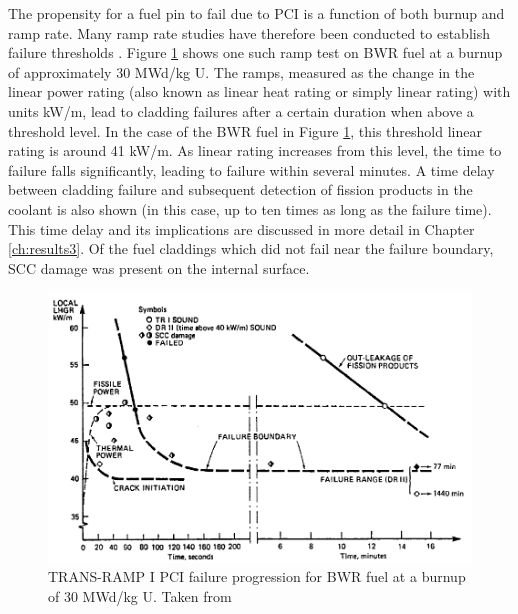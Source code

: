 The propensity for a fuel pin to fail due to PCI is a function of both burnup and ramp rate. Many ramp rate studies have therefore been conducted to establish failure thresholds \cite{Thomas1979, mogard1980studsvik, franklin1985performance, mogard1985international, djurle1984super, howe1991ramp, baba1983power, suzuki1994bumup, wesley1994mark, djurle1983studsvik, hollowell1982international}. Figure \ref{figure:BWRrampthreshold} shows one such ramp test on BWR fuel at a burnup of approximately 30 MWd/kg U. The ramps, measured as the change in the linear power rating (also known as linear heat rating or simply linear rating) with units kW/m, lead to cladding failures after a certain duration when above a threshold level. In the case of the BWR fuel in Figure \ref{figure:BWRrampthreshold}, this threshold linear rating is around 41 kW/m. As linear rating increases from this level, the time to failure falls significantly, leading to failure within several minutes. A time delay between cladding failure and subsequent detection of fission products in the coolant is also shown (in this case, up to ten times as long as the failure time). This time delay and its implications are discussed in more detail in Chapter \ref{ch:results3}. Of the fuel claddings which did not fail near the failure boundary, SCC damage was present on the internal surface. 

\begin{figure}[ht] %
\centering
\includegraphics[width=14.5cm]{images/BWRrampthreshold.png}
\caption[TRANS-RAMP I PCI failure progression for BWR fuel at a burnup of 30 MWd/kg U.]{TRANS-RAMP I PCI failure progression for BWR fuel at a burnup of 30 MWd/kg U. Taken from \cite{Mogard1988}}
\label{figure:BWRrampthreshold}
\end{figure}

